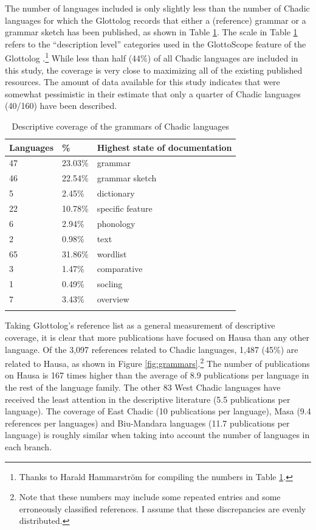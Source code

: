 The number of languages included is only slightly less than the number of Chadic languages for which the Glottolog records that either a (reference) grammar or a grammar sketch has been published, as shown in Table \ref{tab:grammar}. The scale in Table \ref{tab:grammar} refers to the ``description level'' categories used in the GlottoScope feature of the Glottolog \citep{hammarstromSimultaneousVisualizationLanguage2018}.\footnote{Thanks to Harald Hammarström for compiling the numbers in Table \ref{tab:grammar}.} While less than half (44\%) of all Chadic languages are included in this study, the coverage is very close to maximizing all of the existing published resources. The amount of data available for this study indicates that \citet[242]{frajzyngierChadic2012} were somewhat pessimistic in their estimate that only a quarter of Chadic languages (40/160) have been described.

\begin{table}
	\caption{Descriptive coverage of the grammars of Chadic languages}
	\label{tab:grammar}
	\begin{tabular}{lll} %
		\lsptoprule
		Languages &	\%	& Highest state of documentation \\
		\midrule
		47	&	23.03\%	&	grammar  \\
		46	&	22.54\%	&	grammar sketch \\
		5	&	2.45\%	&	dictionary \\
		22	&	10.78\%	&	specific feature \\
		6	&	2.94\%	&	phonology \\
		2	&	0.98\%	&	text \\
		65	&	31.86\%	&	wordlist \\
		3	&	1.47\%	&	comparative \\
		1	&	0.49\%	&	socling \\
		7	&	3.43\%	&	overview \\
		\lspbottomrule
	\end{tabular}
\end{table}

Taking Glottolog’s reference list as a general measurement of descriptive coverage, it is clear that more publications have focused on Hausa than any other language. Of the 3,097 references related to Chadic languages, 1,487 (45\%) are related to Hausa, as shown in Figure \ref{fig:grammars}.\footnote{Note that these numbers may include some repeated entries and some erroneously classified references. I assume that these discrepancies are evenly distributed.} The number of publications on Hausa is 167 times higher than the average of 8.9 publications per language in the rest of the language family. The other 83 West Chadic languages have received the least attention in the descriptive literature (5.5 publications per language). The coverage of East Chadic (10 publications per language), Masa (9.4 references per languages) and Biu-Mandara languages (11.7 publications per language) is roughly similar when taking into account the number of languages in each branch. 

